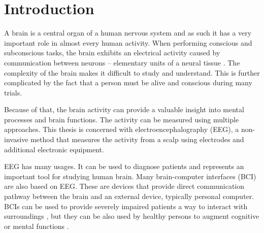 

\glsunsetall

\chapter{Introduction}
A brain is a central organ of a human nervous system and as such it has a very
important role in almost every human activity. When performing conscious and subconscious tasks, the brain exhibits an electrical activity caused by communication between neurons -- elementary units of a neural tissue \cite{brainFacts}. The complexity of the brain makes it difficult to study and understand. This is further complicated by the fact that a person must be alive and conscious during many trials.

Because of that, the brain activity can provide a valuable insight into mental processes and brain functions. The activity can be measured using multiple approaches. This thesis is concerned with electroencephalography (EEG), a non-invasive method that measures the activity from a scalp using electrodes and additional electronic equipment. 

EEG has many usages. It can be used to diagnose patients and represents an important tool for studying human brain. Many brain-computer interfaces (BCI) are also based on EEG. These are devices that provide direct communication pathway between the brain and an external device, typically personal computer. BCIs can be used to provide severely impaired patients a way to interact with surroundings \cite{bcComm}, but they can be also used by healthy persons to augment cognitive or mental functions \cite{compForBrainStudy}. 

